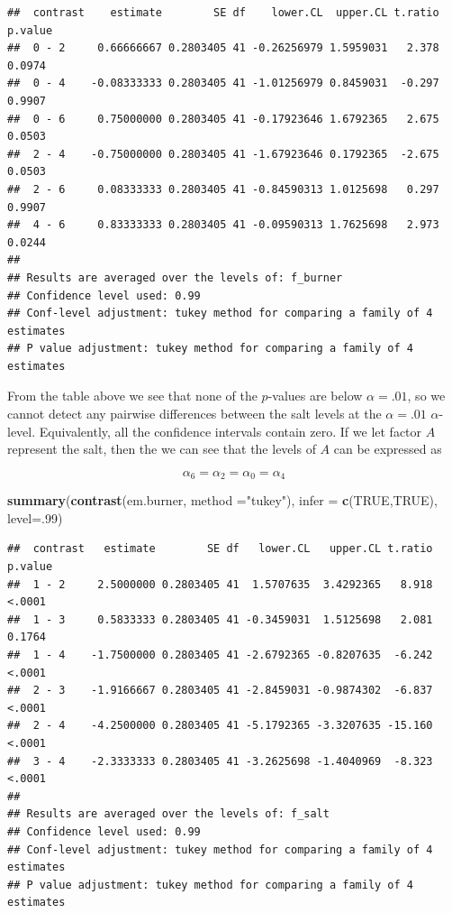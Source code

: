 \documentclass[12pt,]{article}
\newenvironment{Shaded}{\begin{snugshade}}{\end{snugshade}}
\newcommand{\KeywordTok}[1]{\textcolor[rgb]{0.13,0.29,0.53}{\textbf{#1}}}
\newcommand{\DataTypeTok}[1]{\textcolor[rgb]{0.13,0.29,0.53}{#1}}
\newcommand{\DecValTok}[1]{\textcolor[rgb]{0.00,0.00,0.81}{#1}}
\newcommand{\StringTok}[1]{\textcolor[rgb]{0.31,0.60,0.02}{#1}}
\newcommand{\OtherTok}[1]{\textcolor[rgb]{0.56,0.35,0.01}{#1}}
\newcommand{\NormalTok}[1]{#1}
\begin{document}
\begin{verbatim}
##  contrast    estimate        SE df    lower.CL  upper.CL t.ratio p.value
##  0 - 2     0.66666667 0.2803405 41 -0.26256979 1.5959031   2.378  0.0974
##  0 - 4    -0.08333333 0.2803405 41 -1.01256979 0.8459031  -0.297  0.9907
##  0 - 6     0.75000000 0.2803405 41 -0.17923646 1.6792365   2.675  0.0503
##  2 - 4    -0.75000000 0.2803405 41 -1.67923646 0.1792365  -2.675  0.0503
##  2 - 6     0.08333333 0.2803405 41 -0.84590313 1.0125698   0.297  0.9907
##  4 - 6     0.83333333 0.2803405 41 -0.09590313 1.7625698   2.973  0.0244
## 
## Results are averaged over the levels of: f_burner 
## Confidence level used: 0.99 
## Conf-level adjustment: tukey method for comparing a family of 4 estimates 
## P value adjustment: tukey method for comparing a family of 4 estimates
\end{verbatim}

From the table above we see that none of the \(p\)-values are below
\(\alpha = .01\), so we cannot detect any pairwise differences between
the salt levels at the \(\alpha=.01\) \(\alpha\)-level. Equivalently,
all the confidence intervals contain zero. If we let factor \(A\)
represent the salt, then the we can see that the levels of \(A\) can be
expressed as

\[
\alpha_6 = \alpha_2 = \alpha_0 = \alpha_4
\]

\begin{Shaded}
\begin{Highlighting}[]
\KeywordTok{summary}\NormalTok{(}\KeywordTok{contrast}\NormalTok{(em.burner, }\DataTypeTok{method =}\StringTok{"tukey"}\NormalTok{), }\DataTypeTok{infer =} \KeywordTok{c}\NormalTok{(}\OtherTok{TRUE}\NormalTok{,}\OtherTok{TRUE}\NormalTok{), }\DataTypeTok{level=}\NormalTok{.}\DecValTok{99}\NormalTok{)}
\end{Highlighting}
\end{Shaded}

\begin{verbatim}
##  contrast   estimate        SE df   lower.CL   upper.CL t.ratio p.value
##  1 - 2     2.5000000 0.2803405 41  1.5707635  3.4292365   8.918  <.0001
##  1 - 3     0.5833333 0.2803405 41 -0.3459031  1.5125698   2.081  0.1764
##  1 - 4    -1.7500000 0.2803405 41 -2.6792365 -0.8207635  -6.242  <.0001
##  2 - 3    -1.9166667 0.2803405 41 -2.8459031 -0.9874302  -6.837  <.0001
##  2 - 4    -4.2500000 0.2803405 41 -5.1792365 -3.3207635 -15.160  <.0001
##  3 - 4    -2.3333333 0.2803405 41 -3.2625698 -1.4040969  -8.323  <.0001
## 
## Results are averaged over the levels of: f_salt 
## Confidence level used: 0.99 
## Conf-level adjustment: tukey method for comparing a family of 4 estimates 
## P value adjustment: tukey method for comparing a family of 4 estimates
\end{verbatim}
\end{document}
